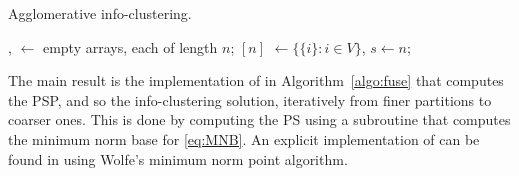 \label{sec:results}
%

\begin{algorithm}
	\caption{Agglomerative info-clustering.}
	\label{alg:aic}
	\BlankLine
	, $\leftarrow$ empty arrays, each of length $n$;\;
	$[n]$ $\leftarrow \{\{i\}:i\in V\}$, $s\leftarrow n$;\;
\end{algorithm}

The main result is the implementation of \Agglomerate in Algorithm~\ref{algo:fuse} that computes the
PSP, and so the info-clustering solution, iteratively from finer partitions to coarser
ones. This is done by computing the PS using a subroutine \MinNormBase that computes the minimum
norm base for \eqref{eq:MNB}. An explicit implementation of \MinNormBase can be found in
\cite{fujishige11} using Wolfe's minimum norm point algorithm.

